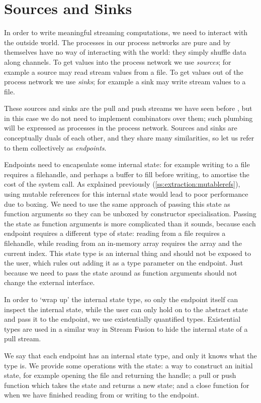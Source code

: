 \section{Sources and Sinks}
In order to write meaningful streaming computations, we need to interact with the outside world.
The processes in our process networks are pure and by themselves have no way of interacting with the world: they simply shuffle data along channels.
To get values into the process network we use \emph{sources}; for example a source may read stream values from a file.
To get values out of the process network we use \emph{sinks}; for example a sink may write stream values to a file.

These sources and sinks are the pull and push streams we have seen before , but in this case we do not need to implement combinators over them; such plumbing will be expressed as processes in the process network.
Sources and sinks are conceptually duals of each other, and they share many similarities, so let us refer to them collectively as \emph{endpoints}.

Endpoints need to encapsulate some internal state: for example writing to a file requires a filehandle, and perhaps a buffer to fill before writing, to amortise the cost of the system call.
As explained previously (\cref{ss:extraction:mutablerefs}), using mutable references for this internal state would lead to poor performance due to boxing.
We need to use the same approach of passing this state as function arguments so they can be unboxed by constructor specialisation.
Passing the state as function arguments is more complicated than it sounds, because each endpoint requires a different type of state: reading from a file requires a filehandle, while reading from an in-memory array requires the array and the current index.
This state type is an internal thing and should not be exposed to the user, which rules out adding it as a type parameter on the endpoint.
Just because we need to pass the state around as function arguments should not change the external interface.

In order to `wrap up' the internal state type, so only the endpoint itself can inspect the internal state, while the user can only hold on to the abstract state and pass it to the endpoint, we use existentially quantified types.
Existential types are used in a similar way in Stream Fusion \cite{coutts2007stream} to hide the internal state of a pull stream.

We say that each endpoint has an internal state type, and only it knows what the type is.
We provide some operations with the state: a way to construct an initial state, for example opening the file and returning the handle; a pull or push function which takes the state and returns a new state; and a close function for when we have finished reading from or writing to the endpoint.

